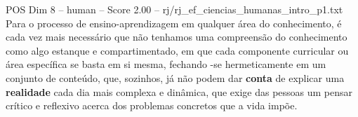 \begin{textsample}{POS Dim 8 – human – Score 2.00 – rj/rj\_ef\_ciencias\_humanas\_intro\_p1.txt}  \label{ex:f8_pos_005}
Para o processo de ensino-aprendizagem em qualquer área do conhecimento, é cada vez mais necessário que não tenhamos uma compreensão do conhecimento como algo estanque e compartimentado, em que cada componente curricular ou área específica se basta em si mesma, fechando -se hermeticamente em um conjunto de conteúdo, que, sozinhos, já não podem dar \textbf{conta} de explicar uma \textbf{realidade} cada dia mais complexa e dinâmica, que exige das pessoas um pensar crítico e reflexivo acerca dos problemas concretos que a vida impõe.

\end{textsample}
